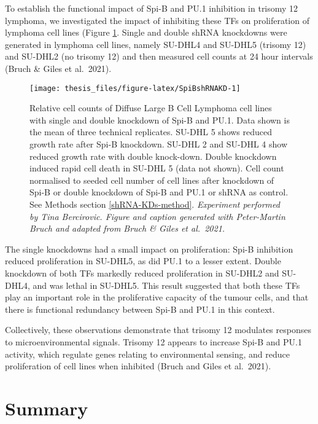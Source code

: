 \documentclass[11pt, a4paper, twosided]{book}
\begin{document}
To establish the functional impact of Spi-B and PU.1 inhibition in trisomy 12 lymphoma, we investigated the impact of inhibiting these TFs on proliferation of lymphoma cell lines (Figure \ref{fig:SpiBshRNAKD}. Single and double shRNA knockdowns were generated in lymphoma cell lines, namely SU-DHL4 and SU-DHL5 (trisomy 12) and SU-DHL2 (no trisomy 12) and then measured cell counts at 24 hour intervals (Bruch \& Giles et al.~2021).


\begin{figure}

{\centering \texttt{[image: thesis\_files/figure-latex/SpiBshRNAKD-1]} 

}

\caption{Relative cell counts of Diffuse Large B Cell Lymphoma cell lines with single and double knockdown of Spi-B and PU.1. Data shown is the mean of three technical replicates. SU-DHL 5 shows reduced growth rate after Spi-B knockdown. SU-DHL 2 and SU-DHL 4 show reduced growth rate with double knock-down. Double knockdown induced rapid cell death in SU-DHL 5 (data not shown). Cell count normalised to seeded cell number of cell lines after knockdown of Spi-B or double knockdown of Spi-B and PU.1 or shRNA as control. See Methods section \ref{shRNA-KDs-method}. \emph{Experiment performed by Tina Bercirovic. Figure and caption generated with Peter-Martin Bruch and adapted from Bruch \& Giles et al.~2021.}}\label{fig:SpiBshRNAKD}
\end{figure}
The single knockdowns had a small impact on proliferation: Spi-B inhibition reduced proliferation in SU-DHL5, as did PU.1 to a lesser extent. Double knockdown of both TFs markedly reduced proliferation in SU-DHL2 and SU-DHL4, and was lethal in SU-DHL5. This result suggested that both these TFs play an important role in the proliferative capacity of the tumour cells, and that there is functional redundancy between Spi-B and PU.1 in this context.

Collectively, these observations demonstrate that trisomy 12 modulates responses to microenvironmental signals. Trisomy 12 appears to increase Spi-B and PU.1 activity, which regulate genes relating to environmental sensing, and reduce proliferation of cell lines when inhibited (Bruch and Giles et al.~2021).

\hypertarget{summary-1}{%
\section{Summary}\label{summary-1}}
\end{document}
